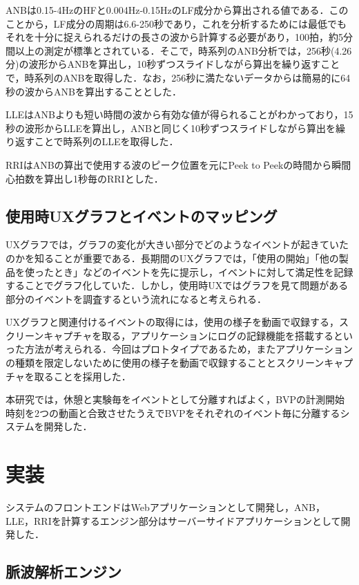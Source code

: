 ANBは0.15-4HzのHFと0.004Hz-0.15HzのLF成分から算出される値である．このことから，LF成分の周期は6.6-250秒であり，これを分析するためには最低でもそれを十分に捉えられるだけの長さの波から計算する必要があり，100拍，約5分間以上の測定が標準とされている\cite{yamaguchi}．そこで，時系列のANB分析では，256秒(4.26分)の波形からANBを算出し，10秒ずつスライドしながら算出を繰り返すことで，時系列のANBを取得した．なお，256秒に満たないデータからは簡易的に64秒の波からANBを算出することとした．

LLEはANBよりも短い時間の波から有効な値が得られることがわかっており，15秒の波形からLLEを算出し，ANBと同じく10秒ずつスライドしながら算出を繰り返すことで時系列のLLEを取得した．

RRIはANBの算出で使用する波のピーク位置を元にPeek to Peekの時間から瞬間心拍数を算出し1秒毎のRRIとした．

\subsection{使用時UXグラフとイベントのマッピング}

UXグラフでは，グラフの変化が大きい部分でどのようなイベントが起きていたのかを知ることが重要である．長期間のUXグラフでは，「使用の開始」「他の製品を使ったとき」などのイベントを先に提示し，イベントに対して満足性を記録することでグラフ化していた．しかし，使用時UXではグラフを見て問題がある部分のイベントを調査するという流れになると考えられる．

UXグラフと関連付けるイベントの取得には，使用の様子を動画で収録する，スクリーンキャプチャを取る，アプリケーションにログの記録機能を搭載するといった方法が考えられる．今回はプロトタイプであるため，またアプリケーションの種類を限定しないために使用の様子を動画で収録することとスクリーンキャプチャを取ることを採用した．

本研究では，休憩と実験毎をイベントとして分離すればよく，BVPの計測開始時刻を2つの動画と合致させたうえでBVPをそれぞれのイベント毎に分離するシステムを開発した．

\section{実装}

システムのフロントエンドはWebアプリケーションとして開発し，ANB，LLE，RRIを計算するエンジン部分はサーバーサイドアプリケーションとして開発した．

\subsection{脈波解析エンジン}

